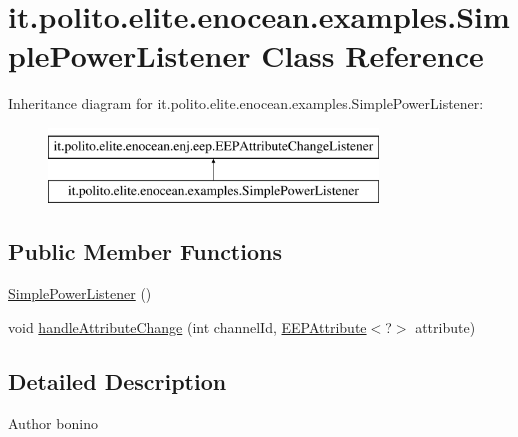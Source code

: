 \hypertarget{classit_1_1polito_1_1elite_1_1enocean_1_1examples_1_1_simple_power_listener}{}\section{it.\+polito.\+elite.\+enocean.\+examples.\+Simple\+Power\+Listener Class Reference}
\label{classit_1_1polito_1_1elite_1_1enocean_1_1examples_1_1_simple_power_listener}
Inheritance diagram for it.\+polito.\+elite.\+enocean.\+examples.\+Simple\+Power\+Listener\+:\begin{figure}[H]
\begin{center}
\leavevmode
\includegraphics[height=2.000000cm]{classit_1_1polito_1_1elite_1_1enocean_1_1examples_1_1_simple_power_listener}
\end{center}
\end{figure}
\subsection*{Public Member Functions}
\begin{DoxyCompactItemize}
\item 
\hyperlink{classit_1_1polito_1_1elite_1_1enocean_1_1examples_1_1_simple_power_listener_ab0a780db653b3491a63811ecec252da0}{Simple\+Power\+Listener} ()
\item 
void \hyperlink{classit_1_1polito_1_1elite_1_1enocean_1_1examples_1_1_simple_power_listener_ab479959b53e0206e832d1e5f31da8cc6}{handle\+Attribute\+Change} (int channel\+Id, \hyperlink{classit_1_1polito_1_1elite_1_1enocean_1_1enj_1_1eep_1_1_e_e_p_attribute}{E\+E\+P\+Attribute}$<$?$>$ attribute)
\end{DoxyCompactItemize}


\subsection{Detailed Description}
\begin{DoxyAuthor}{Author}
bonino 
\end{DoxyAuthor}


